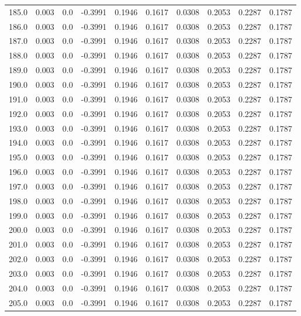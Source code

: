 \begin{longtable}{lrrrrrrrrr}
185.0 & 0.003 & 0.0 & -0.3991 & 0.1946 & 0.1617 & 0.0308 & 0.2053 & 0.2287 & 0.1787 \\
186.0 & 0.003 & 0.0 & -0.3991 & 0.1946 & 0.1617 & 0.0308 & 0.2053 & 0.2287 & 0.1787 \\
187.0 & 0.003 & 0.0 & -0.3991 & 0.1946 & 0.1617 & 0.0308 & 0.2053 & 0.2287 & 0.1787 \\
188.0 & 0.003 & 0.0 & -0.3991 & 0.1946 & 0.1617 & 0.0308 & 0.2053 & 0.2287 & 0.1787 \\
189.0 & 0.003 & 0.0 & -0.3991 & 0.1946 & 0.1617 & 0.0308 & 0.2053 & 0.2287 & 0.1787 \\
190.0 & 0.003 & 0.0 & -0.3991 & 0.1946 & 0.1617 & 0.0308 & 0.2053 & 0.2287 & 0.1787 \\
191.0 & 0.003 & 0.0 & -0.3991 & 0.1946 & 0.1617 & 0.0308 & 0.2053 & 0.2287 & 0.1787 \\
192.0 & 0.003 & 0.0 & -0.3991 & 0.1946 & 0.1617 & 0.0308 & 0.2053 & 0.2287 & 0.1787 \\
193.0 & 0.003 & 0.0 & -0.3991 & 0.1946 & 0.1617 & 0.0308 & 0.2053 & 0.2287 & 0.1787 \\
194.0 & 0.003 & 0.0 & -0.3991 & 0.1946 & 0.1617 & 0.0308 & 0.2053 & 0.2287 & 0.1787 \\
195.0 & 0.003 & 0.0 & -0.3991 & 0.1946 & 0.1617 & 0.0308 & 0.2053 & 0.2287 & 0.1787 \\
196.0 & 0.003 & 0.0 & -0.3991 & 0.1946 & 0.1617 & 0.0308 & 0.2053 & 0.2287 & 0.1787 \\
197.0 & 0.003 & 0.0 & -0.3991 & 0.1946 & 0.1617 & 0.0308 & 0.2053 & 0.2287 & 0.1787 \\
198.0 & 0.003 & 0.0 & -0.3991 & 0.1946 & 0.1617 & 0.0308 & 0.2053 & 0.2287 & 0.1787 \\
199.0 & 0.003 & 0.0 & -0.3991 & 0.1946 & 0.1617 & 0.0308 & 0.2053 & 0.2287 & 0.1787 \\
200.0 & 0.003 & 0.0 & -0.3991 & 0.1946 & 0.1617 & 0.0308 & 0.2053 & 0.2287 & 0.1787 \\
201.0 & 0.003 & 0.0 & -0.3991 & 0.1946 & 0.1617 & 0.0308 & 0.2053 & 0.2287 & 0.1787 \\
202.0 & 0.003 & 0.0 & -0.3991 & 0.1946 & 0.1617 & 0.0308 & 0.2053 & 0.2287 & 0.1787 \\
203.0 & 0.003 & 0.0 & -0.3991 & 0.1946 & 0.1617 & 0.0308 & 0.2053 & 0.2287 & 0.1787 \\
204.0 & 0.003 & 0.0 & -0.3991 & 0.1946 & 0.1617 & 0.0308 & 0.2053 & 0.2287 & 0.1787 \\
205.0 & 0.003 & 0.0 & -0.3991 & 0.1946 & 0.1617 & 0.0308 & 0.2053 & 0.2287 & 0.1787 \\

\end{longtable}
